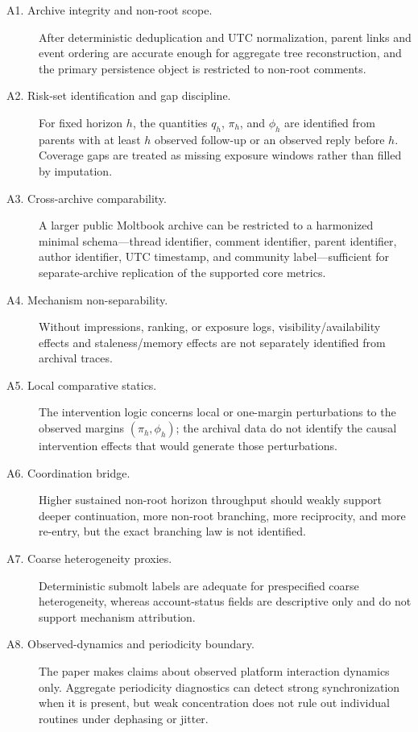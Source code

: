 \begin{description}
\item[A1. Archive integrity and non-root scope.]
After deterministic deduplication and UTC normalization, parent links and event
ordering are accurate enough for aggregate tree reconstruction, and the primary
persistence object is restricted to non-root comments.

\item[A2. Risk-set identification and gap discipline.]
For fixed horizon \(h\), the quantities \(q_h\), \(\pi_h\), and \(\phi_h\) are
identified from parents with at least \(h\) observed follow-up or an observed
reply before \(h\). Coverage gaps are treated as missing exposure windows rather
than filled by imputation.

\item[A3. Cross-archive comparability.]
A larger public Moltbook archive can be restricted to a harmonized minimal
schema---thread identifier, comment identifier, parent identifier, author
identifier, UTC timestamp, and community label---sufficient for separate-archive
replication of the supported core metrics.

\item[A4. Mechanism non-separability.]
Without impressions, ranking, or exposure logs, visibility/availability effects
and staleness/memory effects are not separately identified from archival traces.

\item[A5. Local comparative statics.]
The intervention logic concerns local or one-margin perturbations to the
observed margins \((\pi_h,\phi_h)\); the archival data do not identify the
causal intervention effects that would generate those perturbations.

\item[A6. Coordination bridge.]
Higher sustained non-root horizon throughput should weakly support deeper
continuation, more non-root branching, more reciprocity, and more re-entry, but
the exact branching law is not identified.

\item[A7. Coarse heterogeneity proxies.]
Deterministic submolt labels are adequate for prespecified coarse heterogeneity,
whereas account-status fields are descriptive only and do not support mechanism
attribution.

\item[A8. Observed-dynamics and periodicity boundary.]
The paper makes claims about observed platform interaction dynamics only.
Aggregate periodicity diagnostics can detect strong synchronization when it is
present, but weak concentration does not rule out individual routines under
dephasing or jitter.
\end{description}

